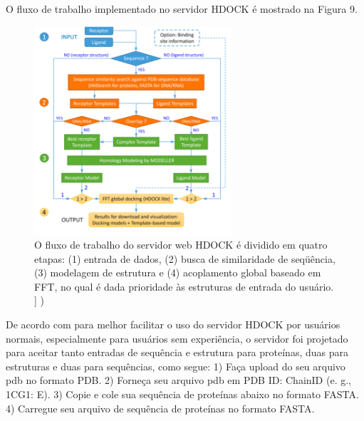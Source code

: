 \documentclass[11pt, letterpaper, portuguese]{article}
\begin{document}
		\par {O fluxo de trabalho implementado no servidor HDOCK é mostrado na Figura 9. }
        \begin{figure}
	    \centering
		\caption{O fluxo de trabalho do servidor web HDOCK é dividido em quatro etapas: (1) entrada de dados, (2) busca de similaridade de seqüência, (3) modelagem de estrutura e (4) acoplamento global baseado em FFT, no qual é dada prioridade às estruturas de entrada do usuário. ] \cite{Yan_2017})}
		\includegraphics[width=0.65\textwidth]{Imagen 2.png}
	\end{figure}\textbf{}

\par De acordo com \cite{Jo_2017} para melhor facilitar o uso do servidor HDOCK por usuários normais, especialmente para usuários sem experiência, o servidor foi projetado para aceitar tanto entradas de sequência e estrutura para proteínas, duas para estruturas e duas para sequências, como segue:
1)	Faça upload do seu arquivo pdb no formato PDB.
2)	Forneça seu arquivo pdb em PDB ID: ChainID (e. g., 1CG1: E).
3)	Copie e cole sua sequência de proteínas abaixo no formato FASTA.
4)	Carregue seu arquivo de sequência de proteínas no formato FASTA.
\end{document}
